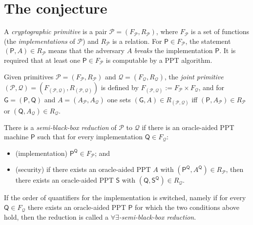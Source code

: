 \documentclass{conjura-conjecture}
\newcommand{\Zc}{\mathcal{Z}}
\newcommand{\Pc}{\mathcal{P}}
\newcommand{\Qc}{\mathcal{Q}}
\newcommand{\semibbu}{[\mathrm{semi}\to\forall\exists\text{-semi}]}
\newcommand{\Ps}{\mathsf{P}}
\newcommand{\Qs}{\mathsf{Q}}
\begin{document}
\section{The conjecture}\label{sec:conjectures}

\begin{definition}\label{def:prim}
A \emph{cryptographic primitive} is a pair $\Pc=(F_{\Pc},R_{\Pc})$, where
$F_{\Pc}$ is a set of functions (the \emph{implementations} of $\Pc$) and
$R_{\Pc}$ is a relation. For $\Ps\in F_{\Pc}$, the statement
$(\Ps,A)\in R_{\Pc}$ means that the adversary $A$ \emph{breaks} the
implementation $\Ps$. It is required that at least one $\Ps\in F_{\Pc}$
is computable by a PPT algorithm.
\end{definition}

\begin{definition}\label{def:joint}
Given primitives $\Pc=(F_{\Pc},R_{\Pc})$ and $\Qc=(F_{\Qc},R_{\Qc})$, the
\emph{joint primitive}
$(\Pc,\Qc)=(F_{(\Pc,\Qc)},R_{(\Pc,\Qc)})$ is defined by
$F_{(\Pc,\Qc)}:=F_{\Pc}\times F_{\Qc}$, and for $\mathsf G=(\Ps,\Qs)$ and
$A=(A_{\Pc},A_{\Qc})$ one sets $(\mathsf G,A)\in R_{(\Pc,\Qc)}$ iff
$(\Ps,A_{\Pc})\in R_{\Pc}$ or $(\Qs,A_{\Qc})\in R_{\Qc}$.
\end{definition}

\begin{definition}\label{def:semi}
There is a \emph{semi-black-box reduction} of $\Pc$ to $\Qc$ if there is
an oracle-aided PPT machine $\Ps$ such that for every implementation
$\Qs\in F_{\Qc}$:
\begin{itemize}
\item (implementation) $\Ps^{\Qs}\in F_{\Pc}$; and
\item (security) if there exists an oracle-aided PPT $A$ with
  $(\Ps^{\Qs},A^{\Qs})\in R_{\Pc}$, then there exists an oracle-aided PPT
  $\mathsf S$ with $(\Qs,\mathsf S^{\Qs})\in R_{\Qc}$.
\end{itemize}
If the order of quantifiers for the implementation is switched, namely if
for every $\Qs\in F_{\Qc}$ there exists an oracle-aided PPT $\Ps$ for
which the two conditions above hold, then the reduction is called a
\emph{$\forall\exists$-semi-black-box reduction}.
\end{definition}

\end{document}
